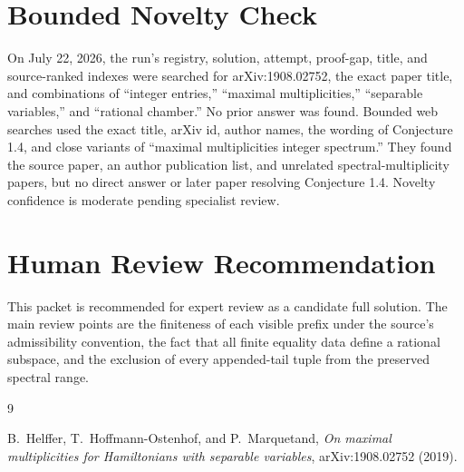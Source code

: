 \documentclass[11pt]{article}
\begin{document}
\section*{Bounded Novelty Check}

On July 22, 2026, the run's registry, solution, attempt, proof-gap, title, and
source-ranked indexes were searched for arXiv:1908.02752, the exact paper
title, and combinations of ``integer entries,'' ``maximal multiplicities,''
``separable variables,'' and ``rational chamber.''  No prior answer was
found.  Bounded web searches used the exact title, arXiv id, author names,
the wording of Conjecture 1.4, and close variants of ``maximal
multiplicities integer spectrum.''  They found the source paper, an author
publication list, and unrelated spectral-multiplicity papers, but no direct
answer or later paper resolving Conjecture 1.4.  Novelty confidence is
moderate pending specialist review.

\section*{Human Review Recommendation}

This packet is recommended for expert review as a candidate full solution.
The main review points are the finiteness of each visible prefix under the
source's admissibility convention, the fact that all finite equality data
define a rational subspace, and the exclusion of every appended-tail tuple
from the preserved spectral range.

\begin{thebibliography}{9}

B.~Helffer, T.~Hoffmann-Ostenhof, and P.~Marquetand,
\emph{On maximal multiplicities for Hamiltonians with separable variables},
arXiv:1908.02752 (2019).

\end{thebibliography}
\end{document}
